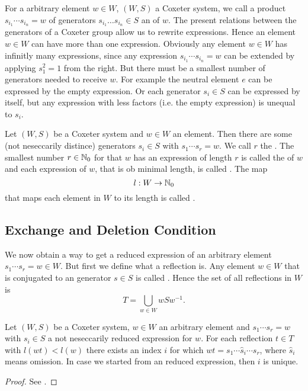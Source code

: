 For a arbitrary element $w \in W$, $(W,S)$ a Coxeter system, we call a product $s_{i_1} \cdots s_{i_n} = w$ of generators $s_{i_1} \ldots s_{i_n} \in S$ an  of $w$. The present relations between the generators of a Coxeter group allow us to rewrite expressions. Hence an element $w \in W$ can have more than one expression. Obviously any element $w \in W$ has infinitly many expressions, since any expression $s_{i_1} \cdots s_{i_n} = w$ can be extended by applying $s_1^2 = 1$ from the right. But there must be a smallest number of generators needed to receive $w$. For example the neutral element $e$ can be expressed by the empty expression. Or each generator $s_i \in S$ can be expressed by itself, but any expression with less factors (i.e. the empty expression) is unequal to $s_i$.

\begin{defi}
	\label{length-function}
	Let $(W,S)$ be a Coxeter system and $w \in W$ an element. Then there are some (not neseccarily distince) generators $s_i \in S$ with $s_1 \cdots s_r = w$. We call $r$ the . The smallest number $r \in \mathbb{N}_0$ for that $w$ has an expression of length $r$ is called the  of $w$ and each expression of $w$, that is ob minimal length, is called . The map
	$$ l : W \to \mathbb{N}_0 $$
	that maps each element in $W$ to its length is called .
\end{defi}

\subsection{Exchange and Deletion Condition}

We now obtain a way to get a reduced expression of an arbitrary element $s_1 \cdots s_r = w \in W$. But first we define what a reflection is. Any element $w \in W$ that is conjugated to an generator $s \in S$ is called . Hence the set of all reflections in $W$ is
$$ T = \bigcup_{w \in W} wSw^{-1}. $$

\begin{theo}
	\label{exchange-condition}
	Let $(W,S)$ be a Coxeter system, $w \in W$ an arbitrary element and ${s_1 \cdots s_r = w}$ with $s_i \in S$ a not neseccarily reduced expression for $w$. For each reflection $t \in T$ with $l(wt) < l(w)$ there exists an index $i$ for which $wt = s_1 \cdots \hat s_i \cdots s_r$, where $\hat s_i$ means omission. In case we started from an reduced expression, then $i$ is unique.

	\begin{proof}
		See \cite[Theorem 5.8]{humphreys:coxeter}.
	\end{proof}
\end{theo}

